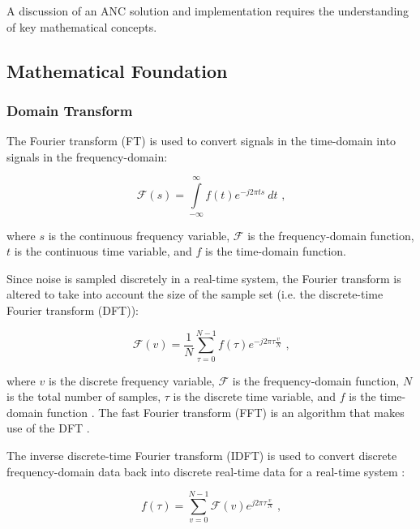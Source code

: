\documentclass[11pt, letterpaper]{article}
\numberwithin{equation}{section}
\begin{document}
A discussion of an ANC solution and implementation requires the understanding of key mathematical concepts.

\subsection{Mathematical Foundation}

\subsubsection{Domain Transform}

The Fourier transform (FT) is used to convert signals in the time-domain into signals in the frequency-domain:

\begin{equation}
    \mathcal{F}(s) = \int \limits_{-\infty}^\infty f(t) e^{-j 2 \pi t s}\ dt \text{ ,}
\end{equation}

where $s$ is the continuous frequency variable, $\mathcal{F}$ is the frequency-domain function, $t$ is the continuous time variable, and $f$ is the time-domain function.

Since noise is sampled discretely in a real-time system, the Fourier transform is altered to take into account the size of the sample set (i.e. the discrete-time Fourier transform (DFT)):

\begin{equation}
    \mathcal{F}(v) = \frac{1}{N} \sum \limits_{\tau = 0}^{N - 1} f(\tau) e^{-j 2 \pi \tau \frac{v}{N}} \text{ ,}
\end{equation}

where $v$ is the discrete frequency variable, $\mathcal{F}$ is the frequency-domain function, $N$ is the total number of samples, $\tau$ is the discrete time variable, and $f$ is the time-domain function \cite{bracewell}. The fast Fourier transform (FFT) is an algorithm that makes use of the DFT \cite{bracewell}.

\pagebreak

The inverse discrete-time Fourier transform (IDFT) is used to convert discrete frequency-domain data back into discrete real-time data for a real-time system \cite{bracewell}:

\begin{equation}
    f(\tau) = \sum \limits_{v = 0}^{N - 1} \mathcal{F}(v) e^{j 2 \pi \tau \frac{v}{N}} \text{ ,}
\end{equation}
\end{document}
